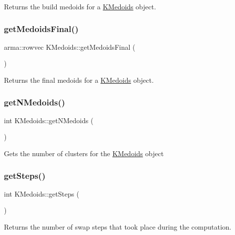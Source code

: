 Returns the build medoids for a \hyperlink{classKMedoids}{K\+Medoids} object. \mbox{\label{classKMedoids_a26aa9827d2541626d959dc984f0f9bcb}} 
\subsubsection{\texorpdfstring{get\+Medoids\+Final()}{getMedoidsFinal()}}
{\footnotesize\ttfamily arma\+::rowvec K\+Medoids\+::get\+Medoids\+Final (\begin{DoxyParamCaption}{ }\end{DoxyParamCaption})}

Returns the final medoids for a \hyperlink{classKMedoids}{K\+Medoids} object. \mbox{\label{classKMedoids_ad738dc6b5a2dafa1ff4aeab807d6407d}} 
\subsubsection{\texorpdfstring{get\+N\+Medoids()}{getNMedoids()}}
{\footnotesize\ttfamily int K\+Medoids\+::get\+N\+Medoids (\begin{DoxyParamCaption}{ }\end{DoxyParamCaption})}

Gets the number of clusters for the \hyperlink{classKMedoids}{K\+Medoids} object \mbox{\label{classKMedoids_a2c8d55468ebe909229ea7bcdb50e8351}} 
\subsubsection{\texorpdfstring{get\+Steps()}{getSteps()}}
{\footnotesize\ttfamily int K\+Medoids\+::get\+Steps (\begin{DoxyParamCaption}{ }\end{DoxyParamCaption})}

Returns the number of swap steps that took place during the computation. \mbox{\label{classKMedoids_a8d5372adbed828602f9311dbe9c70198}} 
